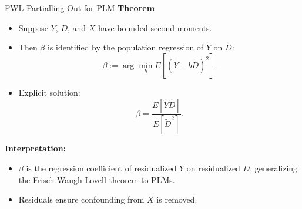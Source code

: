 \documentclass[xcolor=svgnames,t]{beamer}
\begin{document}
        \begin{frame}{FWL Partialling-Out for PLM}
            \textbf{Theorem}
            \begin{itemize}
                \item Suppose \(Y\), \(D\), and \(X\) have bounded second moments.
                \pause
                \item Then \(\beta\) is identified by the population regression of \(\tilde{Y}\) on \(\tilde{D}\):
                \[
                \beta := \arg \min_{b} E[(\tilde{Y} - b\tilde{D})^2].
                \]
                \pause
                \item Explicit solution:
                \[
                \beta = \frac{E[\tilde{Y} \tilde{D}]}{E[\tilde{D}^2]}.
                \]
            \end{itemize}
            
            \pause
            
            \textbf{Interpretation:}
            \begin{itemize}
                \item \(\beta\) is the regression coefficient of residualized \(Y\) on residualized \(D\), generalizing the Frisch-Waugh-Lovell theorem to PLMs.
                \item Residuals ensure confounding from \(X\) is removed.
            \end{itemize}
            \end{frame}
\end{document}
